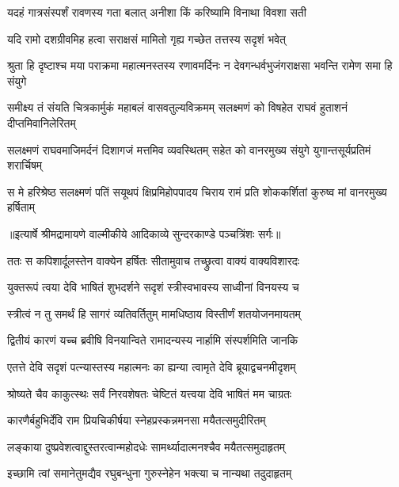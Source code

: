 \twolineshloka
{यदहं गात्रसंस्पर्शं रावणस्य गता बलात्}
{अनीशा किं करिष्यामि विनाथा विवशा सती} %

\twolineshloka
{यदि रामो दशग्रीवमिह हत्वा सराक्षसं}
{मामितो गृह्य गच्छेत तत्तस्य सदृशं भवेत्} %

\fourlineindentedshloka
{श्रुता हि दृष्टाश्च मया पराक्रमा}
{ महात्मनस्तस्य रणावमर्दिनः}
{न देवगन्धर्वभुजंगराक्षसा}
{ भवन्ति रामेण समा हि संयुगे} %

\fourlineindentedshloka
{समीक्ष्य तं संयति चित्रकार्मुकं}
{ महाबलं वासवतुल्यविक्रमम्}
{सलक्ष्मणं को विषहेत राघवं}
{ हुताशनं दीप्तमिवानिलेरितम्} %

\fourlineindentedshloka
{सलक्ष्मणं राघवमाजिमर्दनं}
{ दिशागजं मत्तमिव व्यवस्थितम्}
{सहेत को वानरमुख्य संयुगे}
{ युगान्तसूर्यप्रतिमं शरार्चिषम्} %

\fourlineindentedshloka
{स मे हरिश्रेष्ठ सलक्ष्मणं पतिं}
{ सयूथपं क्षिप्रमिहोपपादय}
{चिराय रामं प्रति शोककर्शितां}
{ कुरुष्व मां वानरमुख्य हर्षिताम्} %


{॥इत्यार्षे श्रीमद्रामायणे वाल्मीकीये आदिकाव्ये सुन्दरकाण्डे पञ्चत्रिंशः सर्गः॥}


\twolineshloka
{ततः स कपिशार्दूलस्तेन वाक्येन हर्षितः}
{सीतामुवाच तच्छ्रुत्वा वाक्यं वाक्यविशारदः} %

\twolineshloka
{युक्तरूपं त्वया देवि भाषितं शुभदर्शने}
{सदृशं स्त्रीस्वभावस्य साध्वीनां विनयस्य च} %

\twolineshloka
{स्त्रीत्वं न तु समर्थं हि सागरं व्यतिवर्तितुम्}
{मामधिष्ठाय विस्तीर्णं शतयोजनमायतम्} %

\twolineshloka
{द्वितीयं कारणं यच्च ब्रवीषि विनयान्विते}
{रामादन्यस्य नार्हामि संस्पर्शमिति जानकि} %

\twolineshloka
{एतत्ते देवि सदृशं पत्न्यास्तस्य महात्मनः}
{का ह्यन्या त्वामृते देवि ब्रूयाद्वचनमीदृशम्} %

\twolineshloka
{श्रोष्यते चैव काकुत्स्थः सर्वं निरवशेषतः}
{चेष्टितं यत्त्वया देवि भाषितं मम चाग्रतः} %

\twolineshloka
{कारणैर्बहुभिर्देवि राम प्रियचिकीर्षया}
{स्नेहप्रस्कन्नमनसा मयैतत्समुदीरितम्} %

\twolineshloka
{लङ्काया दुष्प्रवेशत्वाद्दुस्तरत्वान्महोदधेः}
{सामर्थ्यादात्मनश्चैव मयैतत्समुदाहृतम्} %

\twolineshloka
{इच्छामि त्वां समानेतुमद्यैव रघुबन्धुना}
{गुरुस्नेहेन भक्त्या च नान्यथा तदुदाहृतम्} %

